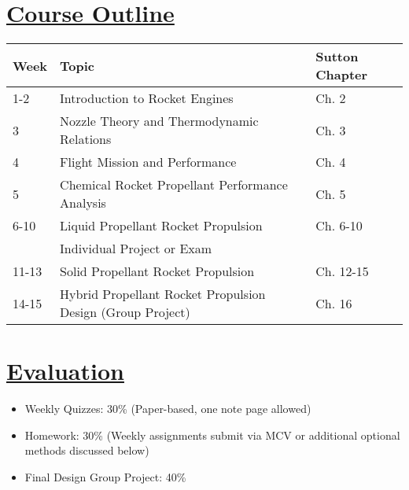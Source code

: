 \documentclass[12pt]{article}
\begin{document}
\section{\hyperref[sec:outline]{Course Outline}}
\label{sec:outline}
\begin{tabular}{lll}
\toprule
\textbf{Week} & \textbf{Topic} & \textbf{Sutton Chapter} \\
\midrule
1-2 & Introduction to Rocket Engines & Ch. 2 \\
3 & Nozzle Theory and Thermodynamic Relations & Ch. 3 \\
4 & Flight Mission and Performance & Ch. 4 \\
5 & Chemical Rocket Propellant Performance Analysis & Ch. 5 \\
6-10 & Liquid Propellant Rocket Propulsion & Ch. 6-10 \\
    & Individual Project or Exam & \\
11-13 & Solid Propellant Rocket Propulsion & Ch. 12-15 \\
14-15 & Hybrid Propellant Rocket Propulsion Design (Group Project) & Ch. 16 \\
\bottomrule
\end{tabular}

\section{\hyperref[sec:evaluation]{Evaluation}}
\label{sec:evaluation}
\begin{itemize}
    \item Weekly Quizzes: 30\% (Paper-based, one note page allowed)
    \item Homework: 30\% (Weekly assignments submit via MCV or additional optional methods discussed below)
    \item Final Design Group Project: 40\%
\end{itemize}
\end{document}
